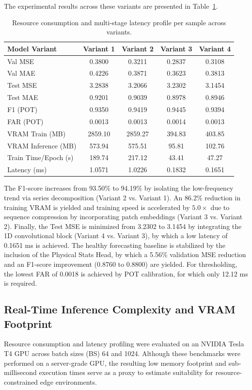 \documentclass[runningheads]{llncs}
\begin{document}
The experimental results across these variants are presented in Table~\ref{tabref:table-5}.

\begin{table}[htbp] 
\caption{Resource consumption and multi-stage latency profile per sample across variants.}
\label{tabref:table-5}
\centering
\footnotesize
\begin{tabular}{|l|c|c|c|c|}
\hline
\textbf{Model Variant} & \textbf{Variant 1} & \textbf{Variant 2} & \textbf{Variant 3} & \textbf{Variant 4} \\ \hline
Val MSE & 0.3800 & 0.3211 & 0.2837 & 0.3108 \\ \hline
Val MAE & 0.4226 & 0.3871 & 0.3623 & 0.3813 \\ \hline
Test MSE & 3.2838 & 3.2066 & 3.2302 & 3.1454 \\ \hline
Test MAE & 0.9201 & 0.9039 & 0.8978 & 0.8946 \\ \hline
F1 (POT) & 0.9350 & 0.9419 & 0.9445 & 0.9394 \\ \hline
FAR (POT) & 0.0013 & 0.0013 & 0.0014 & 0.0013 \\ \hline
VRAM Train (MB) & 2859.10 & 2859.27 & 394.83 & 403.85 \\ \hline
VRAM Inference (MB) & 573.94 & 575.51 & 95.81 & 102.76 \\ \hline
Train Time/Epoch (s) & 189.74 & 217.12 & 43.41 & 47.27 \\ \hline
Latency (ms) & 1.0571 & 1.0226 & 0.1832 & 0.1651 \\ \hline
\end{tabular}
\end{table}

The F1-score increases from 93.50\% to 94.19\% by isolating the low-frequency trend via series decomposition (Variant 2 vs. Variant 1). An 86.2\% reduction in training VRAM is yielded and training speed is accelerated by $5.0\times$ due to sequence compression by incorporating patch embeddings (Variant 3 vs. Variant 2). Finally, the Test MSE is minimized from 3.2302 to 3.1454 by integrating the 1D convolutional block (Variant 4 vs. Variant 3), by which a low latency of 0.1651 ms is achieved. The healthy forecasting baseline is stabilized by the inclusion of the Physical Stats Head, by which a 5.56\% validation MSE reduction and an F1-score improvement (0.8760 to 0.8800) are yielded. For thresholding, the lowest FAR of 0.0018 is achieved by POT calibration, for which only 12.12 ms is required.

\subsection{Real-Time Inference Complexity and VRAM Footprint} \label{sect:s5dot4}
Resource consumption and latency profiling were evaluated on an NVIDIA Tesla T4 GPU across batch sizes (BS) 64 and 1024. Although these benchmarks were performed on a server-grade GPU, the resulting low memory footprint and sub-millisecond execution times serve as a proxy to estimate suitability for resource-constrained edge environments.
\end{document}
